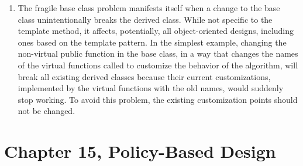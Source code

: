 \begin{enumerate}
\item
  The fragile base class problem manifests itself when a change to the base class unintentionally breaks the derived class. While not specific to the template method, it affects, potentially, all object-oriented designs, including ones based on the template pattern. In the simplest example, changing the non-virtual public function in the base class, in a way that changes the names of the virtual functions called to customize the behavior of the algorithm, will break all existing derived classes because their current customizations, implemented by the virtual functions with the old names, would suddenly stop working. To avoid this problem, the existing customization points should not be changed.
\end{enumerate}

\section{Chapter 15, Policy-Based Design}

